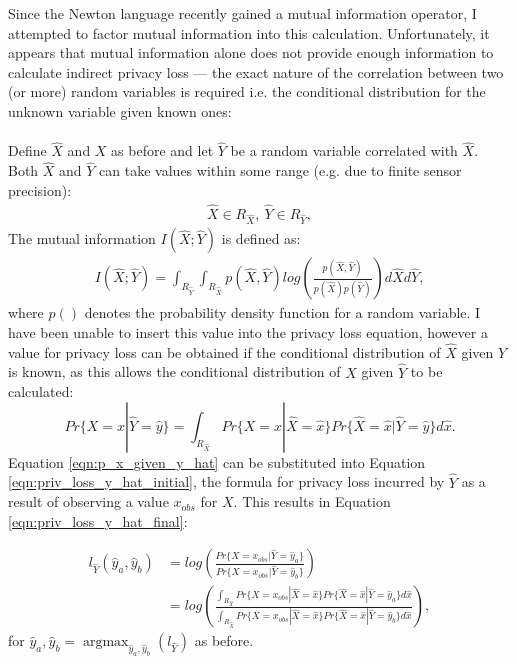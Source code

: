 \documentclass[12pt]{article}
\DeclareMathOperator*{\argmax}{argmax}
\begin{document}
\begin{appendix}
    Since the Newton language recently gained a mutual information operator, I attempted to factor mutual information into this calculation. Unfortunately, it appears that mutual information alone does not provide enough information to calculate indirect privacy loss --- the exact nature of the correlation between two (or more) random variables is required i.e. the conditional distribution for the unknown variable given known ones:
    \\
    \\
    Define $\hat{X}$ and $X$ as before and let $\hat{Y}$ be a random variable correlated with $\hat{X}$. Both $\hat{X}$ and $\hat{Y}$ can take values within some range (e.g. due to finite sensor precision):
    \begin{align*}
      \hat{X} \in R_{\hat{X}},\ \hat{Y} \in R_{\hat{Y}},
    \end{align*}
    The mutual information $I(\hat{X};\hat{Y})$ is defined as:
    \begin{align}
      I(\hat{X};\hat{Y}) = \int_{R_{\hat{Y}}} \int_{R_{\hat{X}}} p(\hat{X}, \hat{Y}) log \left( \frac{p(\hat{X}, \hat{Y})}{p(\hat{X})p(\hat{Y})} \right) d\hat{X} d\hat{Y},
    \end{align}
    where $p()$ denotes the probability density function for a random variable. I have been unable to insert this value into the privacy loss equation, however a value for privacy loss can be obtained if the conditional distribution of $\hat{X}$ given $\hat{Y}$ is known, as this allows the conditional distribution of $X$ given $\hat{Y}$ to be calculated:
    \begin{equation}
      Pr\{X = x | \hat{Y} = \hat{y}\} = \int_{R_{\hat{X}}}Pr\{X = x | \hat{X} = \hat{x}\} Pr\{\hat{X} = \hat{x} | \hat{Y} = \hat{y}\} d \hat{x} \label{eqn:p_x_given_y_hat}.
    \end{equation}
    Equation \ref{eqn:p_x_given_y_hat} can be substituted into Equation \ref{eqn:priv_loss_y_hat_initial}, the formula for privacy loss incurred by $\hat{Y}$ as a result of observing a value $x_{obs}$ for $X$. This results in Equation \ref{eqn:priv_loss_y_hat_final}:

    \begin{align}
      l_{\hat{Y}}(\hat{y}_a, \hat{y}_b) & = log \left( \frac{Pr\{X = x_{obs} | \hat{Y} = \hat{y}_a\}}{Pr\{X = x_{obs} | \hat{Y} = \hat{y}_b\}} \right) \label{eqn:priv_loss_y_hat_initial} \\
      & = log \left( \frac{\int_{R_{\hat{X}}} Pr\{X = x_{obs}| \hat{X} = \hat{x}\} Pr\{\hat{X}=\hat{x}|\hat{Y} = \hat{y}_a\} d\hat{x} }{\int_{R_{\hat{X}}} Pr\{X = x_{obs}| \hat{X} = \hat{x}\} Pr\{\hat{X}=\hat{x}|\hat{Y} = \hat{y}_b\} d\hat{x} }\right) \label{eqn:priv_loss_y_hat_final},
    \end{align}
    for $\hat{y}_a, \hat{y}_b = \argmax_{\hat{y}_a, \hat{y}_b}(l_{\hat{Y}})$ as before.


\end{appendix}
\end{document}
